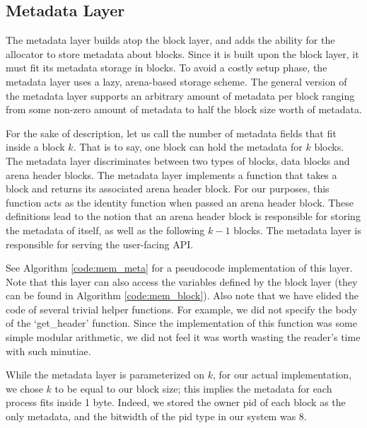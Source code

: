 \documentclass[12pt]{report}
\begin{document}
\subsection{Metadata Layer}
    The metadata layer builds atop the block layer, and adds the ability for the
    allocator to store metadata about blocks. Since it is built upon the block
    layer, it must fit its metadata storage in blocks. To avoid a costly setup
    phase, the metadata layer uses a lazy, arena-based storage scheme. The
    general version of the metadata layer supports an arbitrary amount of
    metadata per block ranging from some non-zero amount of metadata to half the
    block size worth of metadata.

    For the sake of description, let us call the number of metadata fields that
    fit inside a block $k$. That is to say, one block can hold the metadata for
    $k$ blocks. The metadata layer discriminates between two types of blocks,
    data blocks and arena header blocks. The metadata layer implements a
    function that takes a block and returns its associated arena header block.
    For our purposes, this function acts as the identity function when passed
    an arena header block. These definitions lead to the notion that an arena
    header block is responsible for storing the metadata of itself, as well as
    the following $k-1$ blocks. The metadata layer is responsible for serving
    the user-facing API.

    See Algorithm \ref{code:mem_meta} for a pseudocode implementation of this
    layer. Note that this layer can also access the variables defined by the
    block layer (they can be found in Algorithm \ref{code:mem_block}). Also
    note that we have elided the code of several trivial helper functions. For
    example, we did not specify the body of the `get\_header' function. Since
    the implementation of this function was some simple modular arithmetic, we
    did not feel it was worth wasting the reader's time with such minutiae.

    While the metadata layer is parameterized on $k$, for our actual
    implementation, we chose $k$ to be equal to our block size; this implies
    the metadata for each process fits inside 1 byte. Indeed, we stored the
    owner pid of each block as the only metadata, and the bitwidth of the pid
    type in our system was 8.
\end{document}
